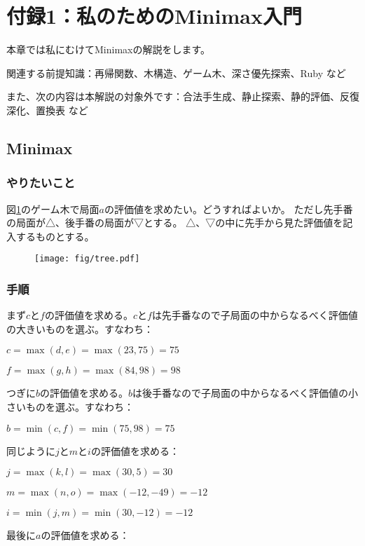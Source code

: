\documentclass[11pt,a4paper]{ltjsarticle}
\begin{document}
\section{付録1：私のためのMinimax入門}

本章では私にむけてMinimaxの解説をします。

関連する前提知識：再帰関数、木構造、ゲーム木、深さ優先探索、Ruby など

また、次の内容は本解説の対象外です：合法手生成、静止探索、静的評価、反復深化、置換表 など


\subsection{Minimax}


\subsubsection{やりたいこと}

図\ref{fig/tree}のゲーム木で局面$a$の評価値を求めたい。どうすればよいか。
ただし先手番の局面が△、後手番の局面が▽とする。
△、▽の中に先手から見た評価値を記入するものとする。

\begin{figure}[h]
  \centering
  \texttt{[image: fig/tree.pdf]}
  \caption{}
  \label{fig/tree}
\end{figure}


\subsubsection{手順}

まず$c$と$f$の評価値を求める。$c$と$f$は先手番なので子局面の中からなるべく評価値の大きいものを選ぶ。すなわち：

$c = \max(d, e) = \max(23, 75) = 75$

$f = \max(g, h) = \max(84, 98) = 98$

つぎに$b$の評価値を求める。$b$は後手番なので子局面の中からなるべく評価値の小さいものを選ぶ。すなわち：

$b = \min(c, f) = \min(75, 98) = 75$

同じように$j$と$m$と$i$の評価値を求める：

$j = \max(k, l) = \max(30, 5) = 30$

$m = \max(n, o) = \max(-12, -49) = -12$

$i = \min(j, m) = \min(30, -12) = -12$

最後に$a$の評価値を求める：
\end{document}

